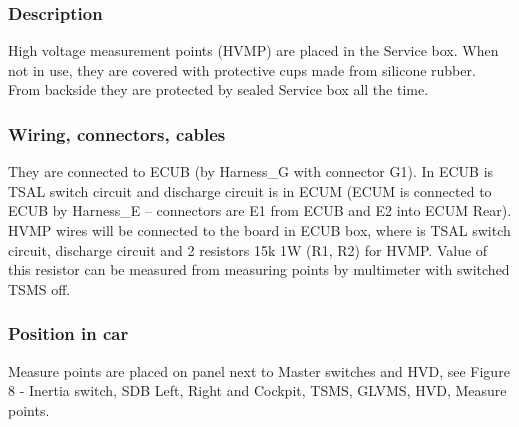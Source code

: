 \subsubsection{Description}

High voltage measurement points (HVMP) are placed in the Service box. When not in use, they are covered with protective cups made from silicone rubber. From backside they are protected by sealed Service box all the time.
\subsubsection{Wiring, connectors, cables}

They are connected to ECUB (by Harness\_G with connector G1). In ECUB is TSAL switch circuit and discharge circuit is in ECUM (ECUM is connected to ECUB by Harness\_E – connectors are E1 from ECUB and E2 into ECUM Rear).
HVMP wires will be connected to the board in ECUB box, where is TSAL switch circuit, discharge circuit and 2 resistors 15k 1W (R1, R2) for HVMP. Value of this resistor can be measured from measuring points by multimeter with switched TSMS off.

\subsubsection{Position in car}

Measure points are placed on panel next to Master switches and HVD, see Figure 8 - Inertia switch, SDB Left, Right and Cockpit, TSMS, GLVMS, HVD, Measure points.